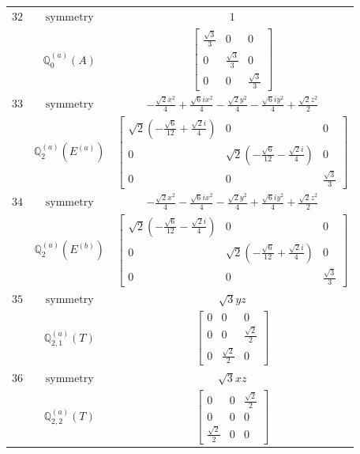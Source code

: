 \documentclass[fleqn,8pt,landscape]{jsarticle}
\begin{document}
\begin{longtable}{ccc}
$ 32 $ & $ \text{symmetry} $ & $ 1 $ \\
$  $ & $ \mathbb{Q}_{0}^{(a)}(A) $ & $ \begin{bmatrix} \frac{\sqrt{3}}{3} & 0 & 0 \\ 0 & \frac{\sqrt{3}}{3} & 0 \\ 0 & 0 & \frac{\sqrt{3}}{3} \end{bmatrix} $ \\ \hline
$ 33 $ & $ \text{symmetry} $ & $ - \frac{\sqrt{2} x^{2}}{4} + \frac{\sqrt{6} i x^{2}}{4} - \frac{\sqrt{2} y^{2}}{4} - \frac{\sqrt{6} i y^{2}}{4} + \frac{\sqrt{2} z^{2}}{2} $ \\
$  $ & $ \mathbb{Q}_{2}^{(a)}(E^{(a)}) $ & $ \begin{bmatrix} \sqrt{2} \left(- \frac{\sqrt{6}}{12} + \frac{\sqrt{2} i}{4}\right) & 0 & 0 \\ 0 & \sqrt{2} \left(- \frac{\sqrt{6}}{12} - \frac{\sqrt{2} i}{4}\right) & 0 \\ 0 & 0 & \frac{\sqrt{3}}{3} \end{bmatrix} $ \\ \hline
$ 34 $ & $ \text{symmetry} $ & $ - \frac{\sqrt{2} x^{2}}{4} - \frac{\sqrt{6} i x^{2}}{4} - \frac{\sqrt{2} y^{2}}{4} + \frac{\sqrt{6} i y^{2}}{4} + \frac{\sqrt{2} z^{2}}{2} $ \\
$  $ & $ \mathbb{Q}_{2}^{(a)}(E^{(b)}) $ & $ \begin{bmatrix} \sqrt{2} \left(- \frac{\sqrt{6}}{12} - \frac{\sqrt{2} i}{4}\right) & 0 & 0 \\ 0 & \sqrt{2} \left(- \frac{\sqrt{6}}{12} + \frac{\sqrt{2} i}{4}\right) & 0 \\ 0 & 0 & \frac{\sqrt{3}}{3} \end{bmatrix} $ \\ \hline
$ 35 $ & $ \text{symmetry} $ & $ \sqrt{3} y z $ \\
$  $ & $ \mathbb{Q}_{2,1}^{(a)}(T) $ & $ \begin{bmatrix} 0 & 0 & 0 \\ 0 & 0 & \frac{\sqrt{2}}{2} \\ 0 & \frac{\sqrt{2}}{2} & 0 \end{bmatrix} $ \\ \hline
$ 36 $ & $ \text{symmetry} $ & $ \sqrt{3} x z $ \\
$  $ & $ \mathbb{Q}_{2,2}^{(a)}(T) $ & $ \begin{bmatrix} 0 & 0 & \frac{\sqrt{2}}{2} \\ 0 & 0 & 0 \\ \frac{\sqrt{2}}{2} & 0 & 0 \end{bmatrix} $ \\ \hline

\end{longtable}
\end{document}
